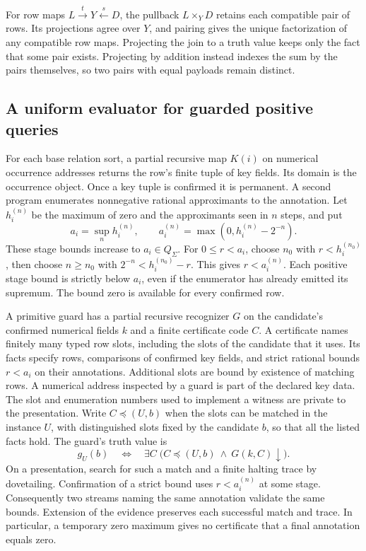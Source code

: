 \documentclass[11pt,a4paper]{article}
\theoremstyle{definition}
\theoremstyle{remark}\newaliascnt{remark}{theorem}
\numberwithin{equation}{section}
\begin{document}
For row maps $L\xrightarrow{t}Y\xleftarrow{s}D$, the pullback $L\times_Y D$ retains each compatible pair of rows. Its projections agree over $Y$, and pairing gives the unique factorization of any compatible row maps. Projecting the join to a truth value keeps only the fact that some pair exists. Projecting by addition instead indexes the sum by the pairs themselves, so two pairs with equal payloads remain distinct.

\subsection{A uniform evaluator for guarded positive queries}
For each base relation sort, a partial recursive map $K(i)$ on numerical occurrence addresses returns the row's finite tuple of key fields. Its domain is the occurrence object. Once a key tuple is confirmed it is permanent. A second program enumerates nonnegative rational approximants to the annotation. Let $h_i^{(n)}$ be the maximum of zero and the approximants seen in $n$ steps, and put
\[
 a_i=\sup_n h_i^{(n)},\qquad a_i^{(n)}=\max(0,h_i^{(n)}-2^{-n}).
\]
These stage bounds increase to $a_i\in Q_\Sigma$. For $0\le r<a_i$, choose $n_0$ with $r<h_i^{(n_0)}$, then choose $n\ge n_0$ with $2^{-n}<h_i^{(n_0)}-r$. This gives $r<a_i^{(n)}$. Each positive stage bound is strictly below $a_i$, even if the enumerator has already emitted its supremum. The bound zero is available for every confirmed row.

A primitive guard has a partial recursive recognizer $G$ on the candidate's confirmed numerical fields $k$ and a finite certificate code $C$. A certificate names finitely many typed row slots, including the slots of the candidate that it uses. Its facts specify rows, comparisons of confirmed key fields, and strict rational bounds $r<a_i$ on their annotations. Additional slots are bound by existence of matching rows. A numerical address inspected by a guard is part of the declared key data. The slot and enumeration numbers used to implement a witness are private to the presentation. Write $C\preceq (U,b)$ when the slots can be matched in the instance $U$, with distinguished slots fixed by the candidate $b$, so that all the listed facts hold. The guard's truth value is
\begin{equation}\label{eq:guard-cert}
 g_U(b)\quad\Longleftrightarrow\quad
 \exists C\;\bigl(C\preceq(U,b)\ \wedge\ G(k,C)\!\downarrow\bigr).
\end{equation}
On a presentation, search for such a match and a finite halting trace by dovetailing. Confirmation of a strict bound uses $r<a_i^{(n)}$ at some stage. Consequently two streams naming the same annotation validate the same bounds. Extension of the evidence preserves each successful match and trace. In particular, a temporary zero maximum gives no certificate that a final annotation equals zero.
\end{document}
